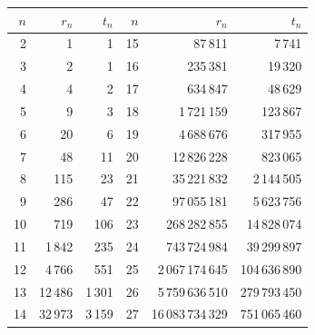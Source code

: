 \begin{tabular}{rrr@{\qquad\qquad}rrr}
\hline
$n$ & $r_n$ & $t_n$ & $n$ & $r_n$ & $t_n$\\
\hline
2 & 1 & 1 & 15 & 87\,811 & 7\,741\\
3 & 2 & 1 & 16 & 235\,381 & 19\,320\\
4 & 4 & 2 & 17 & 634\,847 & 48\,629\\
5 & 9 & 3 & 18 & 1\,721\,159 & 123\,867\\
6 & 20 & 6 & 19 & 4\,688\,676 & 317\,955\\
7 & 48 & 11 & 20 & 12\,826\,228 & 823\,065\\
8 & 115 & 23 & 21 & 35\,221\,832 & 2\,144\,505\\
9 & 286 & 47 & 22 & 97\,055\,181 & 5\,623\,756\\
10 & 719 & 106 & 23 & 268\,282\,855 & 14\,828\,074\\
11 & 1\,842 & 235 & 24 & 743\,724\,984 & 39\,299\,897\\
12 & 4\,766 & 551 & 25 & 2\,067\,174\,645 & 104\,636\,890\\
13 & 12\,486 & 1\,301 & 26 & 5\,759\,636\,510 & 279\,793\,450\\
14 & 32\,973 & 3\,159 & 27 & 16\,083\,734\,329 & 751\,065\,460\\
\hline
\end{tabular}
